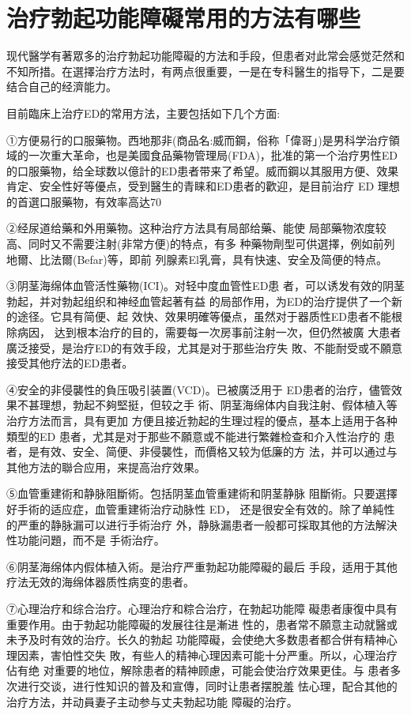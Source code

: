 \documentclass[12pt,UTF8]{ctexbook}
\begin{document}
\section{治疗勃起功能障礙常用的方法有哪些}

现代醫学有著眾多的治疗勃起功能障礙的方法和手段，但患者对此常会感觉茫然和不知所措。在選擇治疗方法时，有两点很重要，一是在专科醫生的指导下，二是要结合自己的经濟能力。

目前臨床上治疗ED的常用方法，主要包括如下几个方面:

①方便易行的口服藥物。西地那非(商品名:威而鋼，俗称「偉哥」)是男科学治疗領域的一次重大革命，也是美國食品藥物管理局(FDA)，批准的第一个治疗男性ED的口服藥物，给全球数以億計的ED患者带来了希望。威而鋼以其服用方便、效果肯定、安全性好等優点，受到醫生的青睐和ED患者的歡迎，是目前治疗 ED 理想的首選口服藥物，有效率高达70%

②经尿道给藥和外用藥物。这种治疗方法具有局部给藥、能使
局部藥物浓度较高、同时又不需要注射(非常方便)的特点，有多
种藥物劑型可供選擇，例如前列地爾、比法爾(Befar)等，即前
列腺素El乳膏，具有快速、安全及简便的特点。

③阴茎海绵体血管活性藥物(ICI)。对轻中度血管性ED患
者，可以诱发有效的阴茎勃起，并对勃起组织和神经血管起著有益
的局部作用，为ED的治疗提供了一个新的途径。它具有简便、起
效快、效果明確等優点，虽然对于器质性ED患者不能根除病因，
达到根本治疗的目的，需要每一次房事前注射一次，但仍然被廣
大患者廣泛接受，是治疗ED的有效手段，尤其是对于那些治疗失
敗、不能耐受或不願意接受其他疗法的ED患者。

④安全的非侵襲性的負压吸引装置(VCD)。已被廣泛用于
ED患者的治疗，儘管效果不甚理想，勃起不夠堅挺，但较之手
術、阴茎海绵体内自我注射、假体植入等治疗方法而言，具有更加
方便且接近勃起的生理过程的優点，基本上适用于各种類型的ED
患者，尤其是对于那些不願意或不能进行繁雜检查和介入性治疗的
患者，是有效、安全、简便、非侵襲性，而價格又较为低廉的方
法，并可以通过与其他方法的聯合应用，来提高治疗效果。

⑤血管重建術和静脉阻斷術。包括阴茎血管重建術和阴茎静脉
阻斷術。只要選擇好手術的适应症，血管重建術治疗动脉性 ED，
还是很安全有效的。除了单純性的严重的静脉漏可以进行手術治疗
外，静脉漏患者一般都可採取其他的方法解決性功能问題，而不是
手術治疗。

⑥阴茎海绵体内假体植入術。是治疗严重勃起功能障礙的最后
手段，适用于其他疗法无效的海绵体器质性病变的患者。

⑦心理治疗和综合治疗。心理治疗和粽合治疗，在勃起功能障
礙患者康復中具有重要作用。由于勃起功能障礙的发展往往是漸进
性的，患者常不願意主动就醫或未予及时有效的治疗。长久的勃起
功能障礙，会使绝大多数患者都合併有精神心理因素，害怕性交失
敗，有些人的精神心理因素可能十分严重。所以，心理治疗佔有绝
对重要的地位，解除患者的精神顾慮，可能会使治疗效果更佳。与
患者多次进行交谈，进行性知识的普及和宣傳，同时让患者摆脫羞
怯心理，配合其他的治疗方法，并动員妻子主动参与丈夫勃起功能
障礙的治疗。
\end{document}
